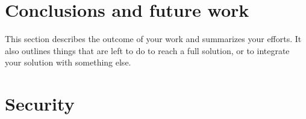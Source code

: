 \section{Conclusions and future work}
This section describes the outcome of your work and summarizes your efforts. It also outlines things that are left to do to reach a full solution, or to integrate your solution with something else.
\section{Security}